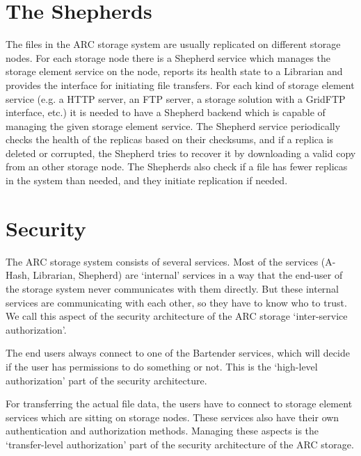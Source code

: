 \documentclass{book}
\begin{document}

\section{The Shepherds} %
\label{sec:the_shepherds}

The files in the ARC storage system are usually replicated on different storage nodes. For each storage node there is a Shepherd service which manages the storage element service on the node, reports its health state to a Librarian and provides the interface for initiating file transfers. For each kind of storage element service (e.g. a HTTP server, an FTP server, a storage solution with a GridFTP interface, etc.) it is needed to have a Shepherd backend which is capable of managing the given storage element service. The Shepherd service periodically checks the health of the replicas based on their checksums, and if a replica is deleted or corrupted, the Shepherd tries to recover it by downloading a valid copy from an other storage node. The Shepherds also check if a file has fewer replicas in the system than needed, and they initiate replication if needed.


\section{Security} %
\label{sec:security}

The ARC storage system consists of several services. Most of the services (A-Hash, Librarian, Shepherd) are `internal' services in a way that the end-user of the storage system never communicates with them directly. But these internal services are communicating with each other, so they have to know who to trust. We call this aspect of the security architecture of the ARC storage `inter-service authorization'.

The end users always connect to one of the Bartender services, which will decide if the user has permissions to do something or not. This is the `high-level authorization' part of the security architecture.

For transferring the actual file data, the users have to connect to storage element services which are sitting on storage nodes. These services also have their own authentication and authorization methods. Managing these aspects is the `transfer-level authorization' part of the security architecture of the ARC storage.
\end{document}
